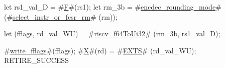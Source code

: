let rs1_val_D = #\hyperref[sailRISCVzF]{F}#(rs1);
let rm_3b     = #\hyperref[sailRISCVzencdeczyroundingzymode]{encdec\_rounding\_mode}# (#\hyperref[sailRISCVzselectzyinstrzyorzyfcsrzyrm]{select\_instr\_or\_fcsr\_rm}#  (rm));

let (fflags, rd_val_WU) = #\hyperref[sailRISCVzriscvzyf64ToUi32]{riscv\_f64ToUi32}# (rm_3b, rs1_val_D);

#\hyperref[sailRISCVzwritezyfflags]{write\_fflags}#(fflags);
#\hyperref[sailRISCVzX]{X}#(rd) = #\hyperref[sailRISCVzEXTS]{EXTS}# (rd_val_WU);
RETIRE_SUCCESS
